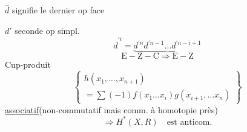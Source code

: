 $\widehat d$ signifie le dernier op face

$d'$ seconde op simpl.
\[
\widehat d^{\prime i}=\underbrace{d^{\prime n}d^{\prime n-1}\ldots d^{\prime n-i+1}}
\]
\[
\mathrm{E\!-\!Z\!-\!C}\Rightarrow\mathrm{E\!-\!Z}
\]
Cup-produit
\[
\left\{\begin{aligned}
h(x_1,\ldots,x_{n+1})\\
{}=\sum(-1)f(x_1\ldots x_i)g(x_{i+1},\ldots x_n)
\end{aligned}\right\}
\]
\uline{associatif}\quad(non-commutatif mais comm. à homotopie près)
\[
\Rightarrow H^*(X,R)\quad\text{est anticom.}
\]
